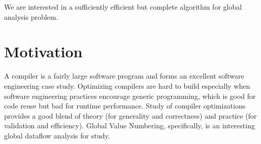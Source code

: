 We are interested in a sufficiently efficient but complete algorithm for global analysis problem.

\section{Motivation}
A compiler is a fairly large software program and forms an excellent software engineering case study. Optimizing compilers are hard to build especially when software engineering practices encourage generic programming, which is good for code reuse but bad for runtime performance. Study of compiler optimizations provides a good blend of theory (for generality and correctness) and practice (for validation and efficiency). Global Value Numbering, specifically, is an interesting global dataflow analysis for study.

